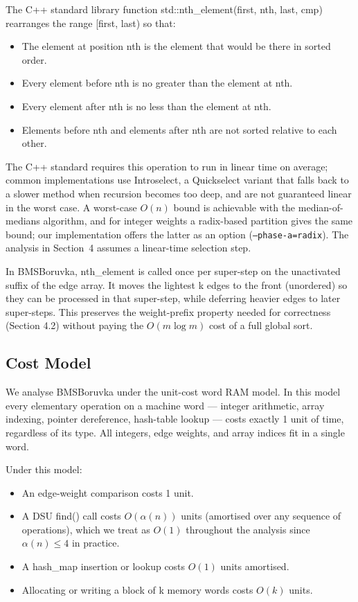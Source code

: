 \documentclass[11pt]{article}
\theoremstyle{plain}
\theoremstyle{remark}
\begin{document}
The C++ standard library function std::nth\_element(first, nth, last,
cmp) rearranges the range {[}first, last) so that:

\begin{itemize}
\item
  The element at position nth is the element that would be there in
  sorted order.
\item
  Every element before nth is no greater than the element at nth.
\item
  Every element after nth is no less than the element at nth.
\item
  Elements before nth and elements after nth are not sorted relative to
  each other.
\end{itemize}

The C++ standard requires this operation to run in linear time on
average; common implementations use Introselect, a Quickselect variant
that falls back to a slower method when recursion becomes too deep, and
are not guaranteed linear in the worst case. A worst-case \(O(n)\)
bound is achievable with the median-of-medians algorithm, and for
integer weights a radix-based partition gives the same bound; our
implementation offers the latter as an option
(\texttt{--phase-a=radix}). The analysis in Section~4 assumes a
linear-time selection step.

In BMSBoruvka, nth\_element is called once per super-step on the
unactivated suffix of the edge array. It moves the lightest k edges to
the front (unordered) so they can be processed in that super-step, while
deferring heavier edges to later super-steps. This preserves the
weight-prefix property needed for correctness (Section 4.2) without
paying the \(O(m \log m)\) cost of a full global sort.

\subsection{Cost Model}

We analyse BMSBoruvka under the unit-cost word RAM model. In this model
every elementary operation on a machine word --- integer arithmetic,
array indexing, pointer dereference, hash-table lookup --- costs exactly
1 unit of time, regardless of its type. All integers, edge weights, and
array indices fit in a single word.

Under this model:

\begin{itemize}
\item
  An edge-weight comparison costs 1 unit.
\item
  A DSU find() call costs \(O(\alpha(n))\) units (amortised over any
  sequence of operations), which we treat as \(O(1)\) throughout the
  analysis since \(\alpha(n) \leq 4\) in practice.
\item
  A hash\_map insertion or lookup costs \(O(1)\) units amortised.
\item
  Allocating or writing a block of k memory words costs \(O(k)\) units.
\end{itemize}
\end{document}
